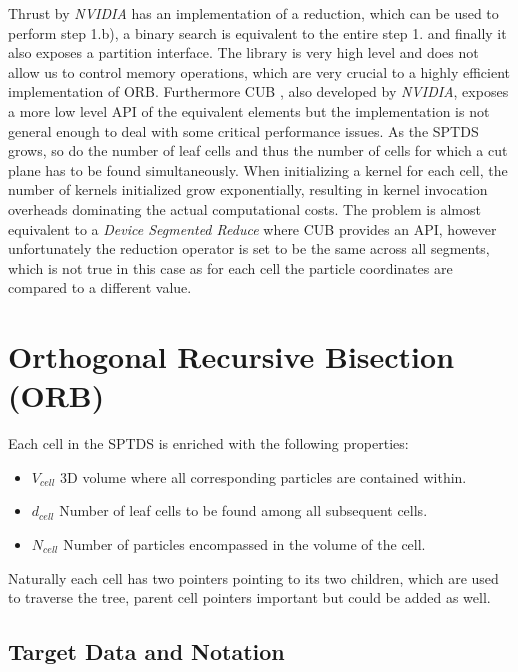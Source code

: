\documentclass[]{article}
\begin{document}
Thrust by \textit{NVIDIA} \cite{thrust} has an implementation of a reduction, which can be used to perform step 1.b), a binary search is equivalent to the entire step 1. and finally it also exposes a partition interface. The library is very high level and does not allow us to control memory operations, which are very crucial to a highly efficient implementation of ORB. 
Furthermore CUB \cite{cub}, also developed by \textit{NVIDIA}, exposes a more low level API of the equivalent elements but the implementation is not general enough to deal with some critical performance issues. As the SPTDS grows, so do the number of leaf cells and thus the number of cells for which a cut plane has to be found simultaneously. When initializing a kernel for each cell, the number of kernels initialized grow exponentially, resulting in kernel invocation overheads dominating the actual computational costs. The problem is almost equivalent to a \textit{Device Segmented Reduce}\cite{cubSeg} where CUB provides an API, however unfortunately the reduction operator is set to be the same across all segments, which is not true in this case as for each cell the particle coordinates are compared to a different value. 


\newpage

\newpage
\section{Orthogonal Recursive Bisection (ORB)} \label{section:orb}


Each cell in the SPTDS is enriched with the following properties:

\begin{itemize}
	\item \textbf{$V_{cell}$} 3D volume where all corresponding particles are contained within.
	\item \textbf{$d_{cell}$} Number of leaf cells to be found among all subsequent cells.
	\item \textbf{$N_{cell}$} Number of particles encompassed in the volume of the cell. 
\end{itemize}

Naturally each cell has two pointers pointing to its two children, which are used to traverse the tree, parent cell pointers important but could be added as well.


\subsection{Target Data and Notation}\label{sec:target-data}
\end{document}
